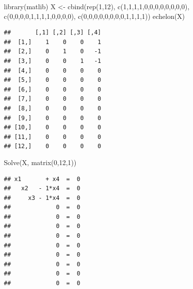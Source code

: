 \documentclass[
]{book}
\newenvironment{Shaded}{\begin{snugshade}}{\end{snugshade}}
\newcommand{\DecValTok}[1]{\textcolor[rgb]{0.00,0.00,0.81}{#1}}
\newcommand{\FunctionTok}[1]{\textcolor[rgb]{0.00,0.00,0.00}{#1}}
\newcommand{\NormalTok}[1]{#1}
\newcommand{\OtherTok}[1]{\textcolor[rgb]{0.56,0.35,0.01}{#1}}
\begin{document}
\begin{Shaded}
\begin{Highlighting}[]
\FunctionTok{library}\NormalTok{(matlib)}
\NormalTok{X }\OtherTok{\textless{}{-}} \FunctionTok{cbind}\NormalTok{(}\FunctionTok{rep}\NormalTok{(}\DecValTok{1}\NormalTok{,}\DecValTok{12}\NormalTok{), }\FunctionTok{c}\NormalTok{(}\DecValTok{1}\NormalTok{,}\DecValTok{1}\NormalTok{,}\DecValTok{1}\NormalTok{,}\DecValTok{1}\NormalTok{,}\DecValTok{0}\NormalTok{,}\DecValTok{0}\NormalTok{,}\DecValTok{0}\NormalTok{,}\DecValTok{0}\NormalTok{,}\DecValTok{0}\NormalTok{,}\DecValTok{0}\NormalTok{,}\DecValTok{0}\NormalTok{,}\DecValTok{0}\NormalTok{), }\FunctionTok{c}\NormalTok{(}\DecValTok{0}\NormalTok{,}\DecValTok{0}\NormalTok{,}\DecValTok{0}\NormalTok{,}\DecValTok{0}\NormalTok{,}\DecValTok{1}\NormalTok{,}\DecValTok{1}\NormalTok{,}\DecValTok{1}\NormalTok{,}\DecValTok{1}\NormalTok{,}\DecValTok{0}\NormalTok{,}\DecValTok{0}\NormalTok{,}\DecValTok{0}\NormalTok{,}\DecValTok{0}\NormalTok{), }\FunctionTok{c}\NormalTok{(}\DecValTok{0}\NormalTok{,}\DecValTok{0}\NormalTok{,}\DecValTok{0}\NormalTok{,}\DecValTok{0}\NormalTok{,}\DecValTok{0}\NormalTok{,}\DecValTok{0}\NormalTok{,}\DecValTok{0}\NormalTok{,}\DecValTok{0}\NormalTok{,}\DecValTok{1}\NormalTok{,}\DecValTok{1}\NormalTok{,}\DecValTok{1}\NormalTok{,}\DecValTok{1}\NormalTok{))}
\FunctionTok{echelon}\NormalTok{(X)}
\end{Highlighting}
\end{Shaded}

\begin{verbatim}
##       [,1] [,2] [,3] [,4]
##  [1,]    1    0    0    1
##  [2,]    0    1    0   -1
##  [3,]    0    0    1   -1
##  [4,]    0    0    0    0
##  [5,]    0    0    0    0
##  [6,]    0    0    0    0
##  [7,]    0    0    0    0
##  [8,]    0    0    0    0
##  [9,]    0    0    0    0
## [10,]    0    0    0    0
## [11,]    0    0    0    0
## [12,]    0    0    0    0
\end{verbatim}

\begin{Shaded}
\begin{Highlighting}[]
\FunctionTok{Solve}\NormalTok{(X, }\FunctionTok{matrix}\NormalTok{(}\DecValTok{0}\NormalTok{,}\DecValTok{12}\NormalTok{,}\DecValTok{1}\NormalTok{))}
\end{Highlighting}
\end{Shaded}

\begin{verbatim}
## x1       + x4  =  0 
##   x2   - 1*x4  =  0 
##     x3 - 1*x4  =  0 
##             0  =  0 
##             0  =  0 
##             0  =  0 
##             0  =  0 
##             0  =  0 
##             0  =  0 
##             0  =  0 
##             0  =  0 
##             0  =  0
\end{verbatim}
\end{document}
